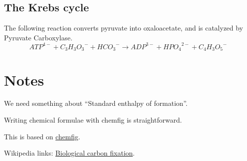 \documentclass{article}
\begin{document}
\subsection{The Krebs cycle}
The following reaction converts pyruvate into oxaloacetate, and is catalyzed by Pyruvate
Carboxylase.
\[
    {ATP}^{4-} + {C_3H_3O_3}^- + {HCO_3}^- \rightarrow {ADP}^{3-} + {HPO_4}^{2-} + {C_4H_3O_5}^-
\]



\section{Notes}\label{sec_notes}

We need something about ``Standard enthalpy of formation''.

Writing chemical formulae with chemfig is straightforward.

This is based on \href{https://www.overleaf.com/learn/latex/Chemistry_formulae}{chemfig}.

Wikipedia links:
\href{https://en.wikipedia.org/wiki/Biological_carbon_fixation}{Biological carbon fixation}.
\end{document}
